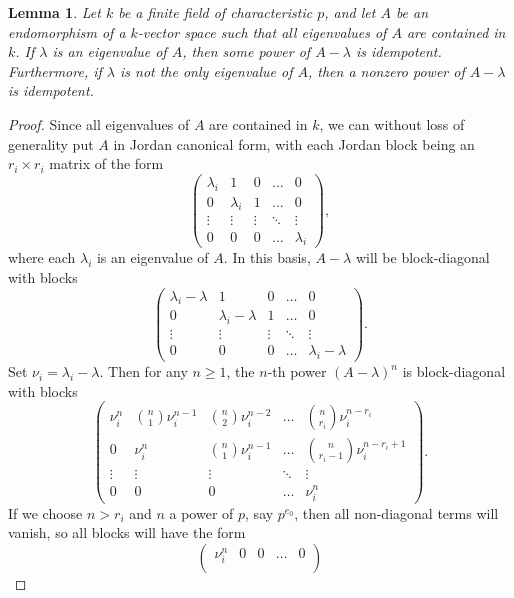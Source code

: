 \documentclass[12pt]{article}
\theoremstyle{theorem}
\numberwithin{thm}{section}
\newtheorem{lem}[thm]{Lemma}
\theoremstyle{definition}
\begin{document}
\begin{lem}\label{lem:jordan}
  Let $k$ be a finite field of characteristic $p$, and let $A$ be an endomorphism of a $k$-vector space such that all eigenvalues of $A$ are contained in $k$. If $\lambda$ is an eigenvalue of $A$, then some power of $A-\lambda$ is idempotent.
  Furthermore, if $\lambda$ is not the only eigenvalue of $A$, then a  nonzero power of $A-\lambda$ is idempotent.
\end{lem}
\begin{proof}
  Since all eigenvalues of $A$ are contained in $k$, we can without loss of generality put $A$ in Jordan canonical form, with each Jordan block being an $r_i\times r_i$ matrix of the form
  \[ \begin{pmatrix}
        \lambda_i & 1 & 0 & \dots & 0 \\
        0 & \lambda_i & 1  & \dots & 0 \\
        \vdots & \vdots & \vdots & \ddots & \vdots \\
        0 & 0 & 0 & \dots & \lambda_i
    \end{pmatrix}, \]
  where each $\lambda_i$ is an eigenvalue of $A$.
  In this basis, $A-\lambda$ will be block-diagonal with blocks
  \[ \begin{pmatrix}
    \lambda_i-\lambda & 1 & 0 & \dots & 0 \\
    0 & \lambda_i-\lambda & 1 & \dots & 0 \\
    \vdots & \vdots & \vdots & \ddots & \vdots \\
    0 & 0 & 0 & \dots & \lambda_i-\lambda
  \end{pmatrix}. \]
  Set $\nu_i=\lambda_i-\lambda$. Then for any $n\geq 1$,
  the $n$-th power $(A-\lambda)^n$ is block-diagonal with blocks
  \[ \begin{pmatrix}
    \nu_i^n & \binom{n}1\nu_i^{n-1} & \binom{n}2\nu_i^{n-2} & \dots & \binom{n}{r_i}\nu_i^{n-r_i} \\
    0 & \nu_i^n & \binom{n}1\nu_i^{n-1} & \dots & \binom{n}{r_i-1}\nu_i^{n-r_i+1} \\
    \vdots & \vdots & \vdots & \ddots & \vdots \\
    0 & 0 & 0 & \dots & \nu_i^n
  \end{pmatrix}. \]
  If we choose $n > r_i$ and $n$ a power of $p$, say $p^{e_0}$, then all non-diagonal terms will vanish, so all blocks will have the form
  \[ \begin{pmatrix}
    \nu_i^n & 0 & 0 & \dots & 0 \\

\end{pmatrix}\]
\end{proof}
\end{document}
